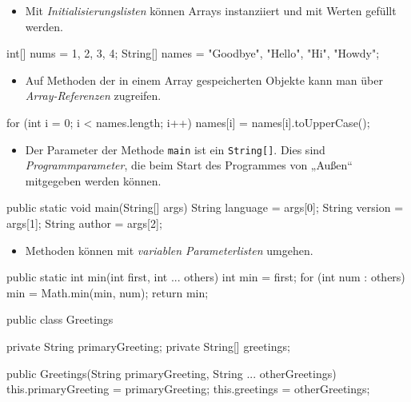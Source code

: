 \documentclass[a4paper,10pt, dvipsnames]{report}
\begin{document}
\begin{itemize}
	\item Mit \textit{Initialisierungslisten} können Arrays instanziiert und mit Werten gefüllt werden.
\end{itemize}

\begin{javacodebox}
int[] nums = {1, 2, 3, 4};
String[] names = {"Goodbye", "Hello", "Hi", "Howdy"};
\end{javacodebox}

\begin{itemize}
	\item Auf Methoden der in einem Array gespeicherten Objekte kann man über \textit{Array-Referenzen} zugreifen.
\end{itemize}

\begin{javacodebox}
for (int i = 0; i < names.length; i++) {
	names[i] = names[i].toUpperCase();
}
\end{javacodebox}

\begin{itemize}
	\item Der Parameter der Methode \texttt{main} ist ein \texttt{String[]}. Dies sind \textit{Programmparameter}, die beim Start des Programmes von „Außen“ mitgegeben werden können.
\end{itemize}

\begin{javacodebox}
public static void main(String[] args) {
	String language = args[0];
	String version = args[1];
	String author = args[2];
}
\end{javacodebox}

\begin{itemize}
	\item Methoden können mit \textit{variablen Parameterlisten} umgehen.
\end{itemize}

\begin{javacodebox}
public static int min(int first, int ... others) {
	int min = first;
	for (int num : others) {
		min = Math.min(min, num);
	}
	return min;
}
\end{javacodebox}

\begin{javacodebox}
public class Greetings {
	private String primaryGreeting;
	private String[] greetings;

	public Greetings(String primaryGreeting, String ... otherGreetings) {
		this.primaryGreeting = primaryGreeting;
		this.greetings = otherGreetings;
	}
}
\end{javacodebox}
\end{document}
